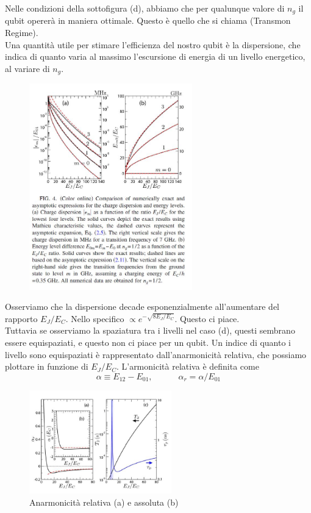 \documentclass[10pt,a4paper]{article}
\begin{document}
Nelle condizioni della sottofigura (d), abbiamo che per qualunque valore di $n_g$ il qubit opererà in maniera ottimale. Questo è quello che si chiama (Transmon Regime).\\

Una quantità utile per stimare l'efficienza del nostro qubit è la dispersione, che indica di quanto varia al massimo l'escursione di energia di un livello energetico, al variare di $n_g$.

\begin{figure}[h]
    \centering
    \includegraphics[width=0.63\textwidth]{dispersion.JPG}
    \caption{}
    \label{disp}
\end{figure}
\FloatBarrier

Osserviamo che la dispersione decade esponenzialmente all'aumentare del rapporto $E_J/E_C$. Nello specifico $\propto e^{-\sqrt{8E_J/E_C}}$. Questo ci piace.\\
Tuttavia se osserviamo la spaziatura tra i livelli nel caso (d), questi sembrano essere equispaziati, e questo non ci piace per un qubit. Un indice di quanto i livello sono equispaziati è rappresentato dall'anarmonicità relativa, che possiamo plottare in funzione di $E_J/E_C$.
L'armonicità relativa è definita come $$\alpha \equiv E_{12}-E_{01}, \qquad \quad \alpha_r=\alpha/E_{01}$$


\begin{figure}[h]
    \centering
    \includegraphics[width=0.55\textwidth]{anarmonicity.JPG}
    \caption{Anarmonicità relativa (a) e assoluta (b)}
    \label{an}
\end{figure}
\FloatBarrier
\end{document}

